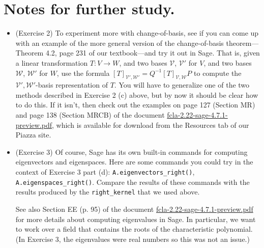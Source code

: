 \documentclass[fleqn,11pt]{paper}
\theoremstyle{remark}
\newcommand{\<}{\ensuremath{\langle}}
\renewcommand{\>}{\ensuremath{\rangle}}
\newcommand\sV{\ensuremath{\mathcal V}}
\newcommand\sW{\ensuremath{\mathcal W}}
\begin{document}
  \section{Notes for further study.}
  \begin{itemize}
  \item (Exercise 2)
  To experiment more with change-of-basis, see if you can come up with an example of the
  more general version of the change-of-basis theorem---Theorem 4.2, page 231 of our textbook---and
  try it out in Sage. 
  That is, given a linear transformation $T: V \to W$, and two bases $\sV$, $\sV'$ for $V$,
  and two bases $\sW$, $\sW'$ for $W$, use the formula
  $[T]_{\sV',\sW'} = Q^{-1}[T]_{\sV,\sW}P$ to compute the $\sV',\sW'$-basis representation of $T$. 
  You will have to generalize one of the two methods described in Exercise 2 (c) above, 
  but by now it should be clear how to do this. If it isn't, then 
  check out the examples on page 127 (Section MR) and page 138 (Section MRCB) 
  of the document 
  \href{http://linear.ups.edu/download/fcla-2.22-sage-4.7.1-preview.pdf}{fcla-2.22-sage-4.7.1-preview.pdf},
  which is available for download from the Resources tab of our Piazza site.
\item (Exercise 3) 
  Of course, Sage has its own built-in commands for computing eigenvectors and eigenspaces.  
  Here are some commands you could try in the context of Exercise 3 part (d): 
  \verb|A.eigenvectors_right()|, \verb|A.eigenspaces_right()|. Compare
  the results of these commands with the results produced by 
  the \verb|right_kernel| that we used above.

  See also Section EE (p. 95) of the document 
  \href{http://linear.ups.edu/download/fcla-2.22-sage-4.7.1-preview.pdf}{fcla-2.22-sage-4.7.1-preview.pdf}
  for more details about computing eigenvalues in Sage.  In particular, we want to work over a field
  that contains the roots of the characteristic polynomial.  (In Exercise 3,
  the eigenvalues were real numbers so this was not an issue.)
  \end{itemize}
\end{document}
